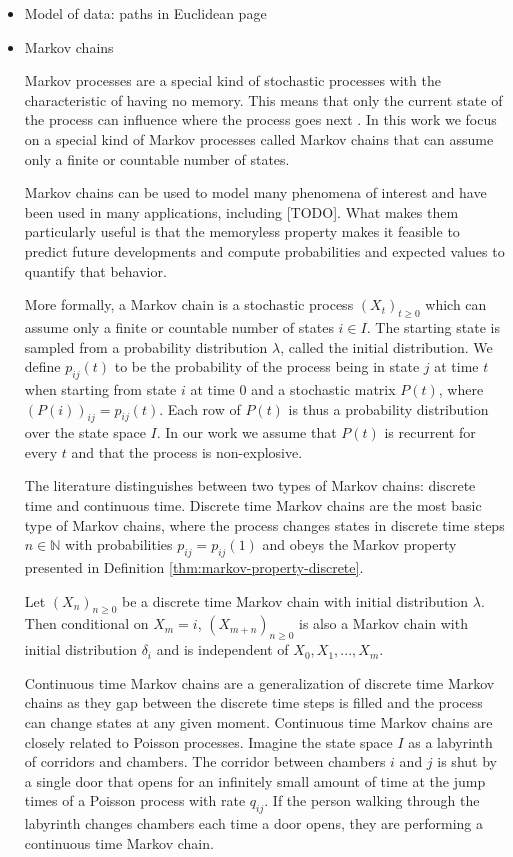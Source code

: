 \begin{itemize}
\item Model of data: paths in Euclidean page
	\item Markov chains
	
	Markov processes are a special kind of stochastic processes with the characteristic of 
	having no memory. This means that only the current state of the process can influence
	where the process goes next \cite{norris1998markov}. In this work we focus on a special kind
	of Markov processes called Markov chains that can assume only a finite or countable
	number of states.
	
	Markov chains can be used to model many phenomena of interest and have been used in many
	applications, including [TODO]. What makes them particularly useful is that the memoryless
	property makes it feasible to predict future developments and compute probabilities and
	expected values to quantify that behavior.
	
	More formally, a Markov chain is a stochastic process $(X_t)_{t \ge 0}$ which can assume
	only a finite or countable number of states $i \in I$. The starting state
	is sampled from a probability distribution $\lambda$, called the initial distribution.
	We define $p_{ij}(t)$ to be the probability of the process being in state $j$ at time $t$
	when starting from state $i$ at time $0$ and a stochastic matrix $P(t)$, where $\left(P(i)\right)_{ij} = p_{ij}(t)$.
	Each row of $P(t)$ is thus a probability distribution over the state space $I$. In our
	work we assume that $P(t)$ is recurrent for every $t$ and that the process is non-explosive.
	
	The literature distinguishes between two types of Markov chains: discrete time and continuous time.
	Discrete time Markov chains are the most basic type of Markov chains, where the process
	changes states in discrete time steps $n \in \mathbb{N}$ with probabilities $p_{ij} = p_{ij}(1)$
	and obeys the Markov property presented in Definition \ref{thm:markov-property-discrete}.
	
	\begin{defn}
	\label{thm:markov-property-discrete}
	Let $(X_n)_{n \ge 0}$ be a discrete time Markov chain with initial distribution $\lambda$.
	Then conditional on $X_m = i$, $(X_{m + n})_{n \ge 0}$ is also a Markov chain with initial
	distribution $\delta_i$ and is independent of $X_0, X_1, ..., X_m$.
	\end{defn}
	
	Continuous time Markov chains are a generalization of discrete time Markov chains as they
	gap between the discrete time steps is filled and the process can change states at any given moment.
	Continuous time Markov chains are closely related to Poisson processes. Imagine the state
	space $I$ as a labyrinth of corridors and chambers. The corridor between chambers $i$ and $j$
	is shut by a single door that opens for an infinitely small amount of time at the jump times of
	a Poisson process with rate $q_{ij}$. If the person walking through the labyrinth changes
	chambers each time a door opens, they are performing
	a continuous time Markov chain.
	

\end{itemize}
